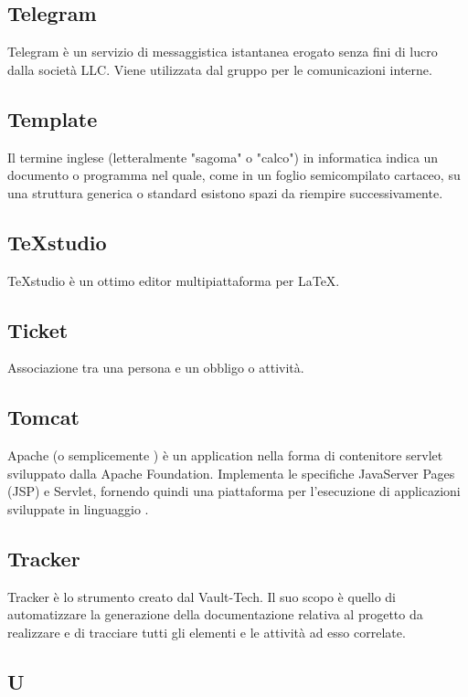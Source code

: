 \subsection{Telegram}
Telegram è un servizio di messaggistica istantanea erogato senza fini di lucro dalla società  LLC. Viene utilizzata dal gruppo per le comunicazioni interne.

\subsection{Template}
Il termine inglese  (letteralmente "sagoma" o "calco") in informatica
indica un documento o programma nel quale, come in un foglio semicompilato
cartaceo, su una struttura generica o standard esistono spazi da riempire
successivamente.

\subsection{TeXstudio}
TeXstudio è un ottimo editor multipiattaforma per LaTeX.

\subsection{Ticket}
Associazione tra una persona e un obbligo o attività.

\subsection{Tomcat}
Apache  (o semplicemente ) è un application  nella forma di contenitore servlet  sviluppato dalla Apache  Foundation. Implementa le specifiche JavaServer Pages (JSP) e Servlet, fornendo quindi una piattaforma  per l'esecuzione di applicazioni  sviluppate in linguaggio . 

\subsection{Tracker}
Tracker è lo strumento  creato dal  Vault-Tech. Il suo scopo è quello di automatizzare la generazione della documentazione relativa al progetto da realizzare e di tracciare tutti gli elementi e le attività ad esso correlate.

\newpage

\begin{center}
\Huge\section{\uppercase{U}}
\end{center}


